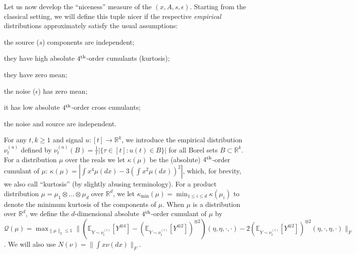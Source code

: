 \documentclass[twoside,11pt]{article}
\newcommand{\todoc}[2][]{ \todo[color=Apricot,size=\tiny,#1]{#2}} %
\newcommand{\E}{\mathbb{E}}
\newcommand{\real}{\mathbb{R}}
\newcommand{\R}{\real}
\newcommand{\cQ}{\mathcal{Q}}
\newcommand{\eps}{\epsilon}
\begin{document}
Let us now develop the ``niceness'' measure of the $(x,A,s,\eps)$. 
Starting from the classical setting, we will define this tuple nicer if the respective \emph{empirical} 
distributions approximately satisfy the usual assumptions: 
\begin{inparaenum}
\item the source ($s$) components are independent;
\item they have high absolute $4^{\rm th}$-order cumulants (kurtosis);
\item they have zero mean;
\item the noise ($\eps$) has  zero mean;
\item it has low absolute $4^{\rm th}$-order cross cumulants;
\item the noise and source are independent.
\end{inparaenum}
For any $t,k \ge 1$ and signal $u:[t] \to \R^k$, we introduce the empirical distribution $\nu_t^{(u)}$ defined by
$\nu_t^{(u)}(B)=\tfrac{1}{t}|\{\tau \in [t]: u(t) \in B\}|$ for all Borel sets $B \subset \R^k$. 
For a distribution $\mu$ over the reals we let $\kappa(\mu)$ be the (absolute) $4^{\rm th}$-order cumulant of $\mu$: 
$\kappa(\mu) = |\int x^4 \mu(dx) - 3 (\int x^2 \mu(dx))^2|$, which, for brevity, we also call ``kurtosis'' (by slightly abusing terminology).
For a product distribution $\mu= \mu_1\otimes \ldots \otimes \mu_d$ over $\real^d$, we let $\kappa_{\min}(\mu)
=\min_{1\le i \le d} \kappa(\mu_i)$ to denote the minimum kurtosis of the components of $\mu$.
When $\mu$ is a distribution over $\real^d$, we define the $d$-dimensional absolute 
$4^{\rm th}$-order cumulant of $\mu$ by 
$\cQ(\mu) = \max_{\|\mu\|_2 \le 1}\| \left(\E_{Y\sim \nu_t^{(\epsilon)}} [Y^{\otimes4}] - (\E_{Y\sim \nu_t^{(\epsilon)}} [Y^{\otimes2}])^{\otimes 2}\right)(\eta,\eta,\cdot,\cdot)  - 2 (\E_{Y\sim \nu_t^{(\epsilon)}} [Y^{\otimes2}])^{\otimes 2}(\eta,\cdot,\eta,\cdot)\|_F $.
We will also use $N(\nu) = \|\int x \nu(dx)\|_F$.
\end{document}
